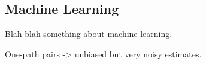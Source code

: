\subsection{Machine Learning}

Blah blah something about machine learning. 

One-path pairs -> unbiased but very noisy estimates. 
